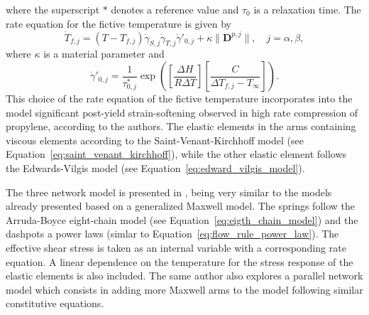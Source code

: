 where the superscript $*$ denotes a reference value and $\tau_0$ is a relaxation time.
The rate equation for the fictive temperature is given by
\begin{equation}
	\dot T_{f,j} = (T - T_{f,j})\dot\gamma_{S,j}\dot\gamma_{T,j}\dot\gamma'_{0,j} + \kappa \|\mathbf D^{p,j}\|,\quad j = \alpha, \beta,
\end{equation}
where $\kappa$ is a material parameter and
\begin{equation}
	\dot \gamma'_{0,j} = \frac{1}{\tau^*_{0,j}} \exp\left(\left[\frac{\Delta H}{R\Delta T}\right]\left[\frac{C}{\Delta T_{f,j} - T_\infty}\right]\right).
\end{equation}
This choice of the rate equation of the fictive temperature incorporates into the model significant post-yield strain-softening observed in high rate compression of propylene, according to the authors.
The elastic elements in the arms containing viscous elements according to the Saint-Venant-Kirchhoff model (see Equation~\eqref{eq:saint_venant_kirchhoff}), while the other elastic element follows the Edwards-Vilgis model (see Equation~\eqref{eq:edward_vilgis_model}).

The three network model is presented in \citep{bergstromMechanicsSolidPolymers2015}, being very similar to the models already presented based on a generalized Maxwell model.
The springs follow the Arruda-Boyce eight-chain model (see Equation~\eqref{eq:eigth_chain_model}) and the dashpots a power laws (simlar to Equation~\eqref{eq:flow_rule_power_law}).
The effective shear stress is taken as an internal variable with a corresponding rate equation.
A linear dependence on the temperature for the stress response of the elastic elements is also included.
The same author also explores a parallel network model which consists in adding more Maxwell arms to the model following similar constitutive equations.

